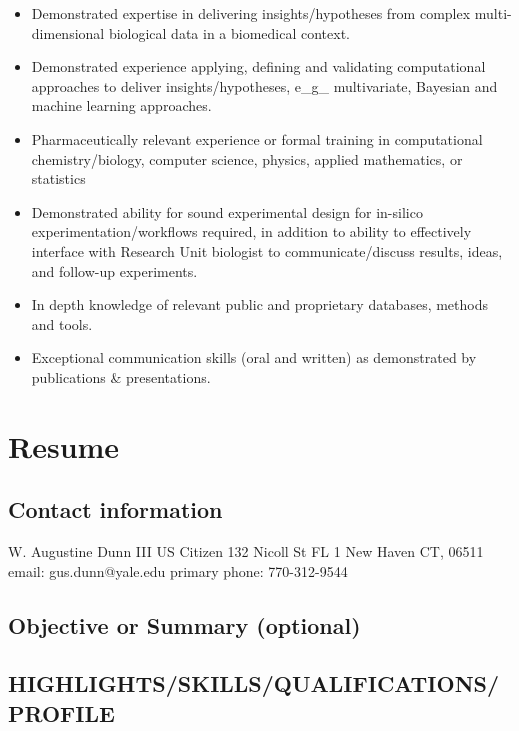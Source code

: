\documentclass[letterpaper]{scrartcl}
\begin{document}
\begin{itemize}
\itemsep1pt\parskip0pt
\item
  Demonstrated expertise in delivering insights/hypotheses from complex
  multi-dimensional biological data in a biomedical context.
\item
  Demonstrated experience applying, defining and validating
  computational approaches to deliver insights/hypotheses, e\_g\_
  multivariate, Bayesian and machine learning approaches.
\item
  Pharmaceutically relevant experience or formal training in
  computational chemistry/biology, computer science, physics, applied
  mathematics, or statistics
\item
  Demonstrated ability for sound experimental design for in-silico
  experimentation/workflows required, in addition to ability to
  effectively interface with Research Unit biologist to
  communicate/discuss results, ideas, and follow-up experiments.
\item
  In depth knowledge of relevant public and proprietary databases,
  methods and tools.
\item
  Exceptional communication skills (oral and written) as demonstrated by
  publications \& presentations.
\end{itemize}

\section{Resume}\label{resume}

\subsection{Contact information}\label{contact-information}

W. Augustine Dunn III US Citizen 132 Nicoll St FL 1 New Haven CT, 06511
email: gus.dunn@yale.edu \textbar{} primary phone: 770-312-9544

\subsection{Objective or Summary
(optional)}\label{objective-or-summary-optional}

\subsection{HIGHLIGHTS/SKILLS/QUALIFICATIONS/PROFILE}\label{highlightsskillsqualificationsprofile}
\end{document}

